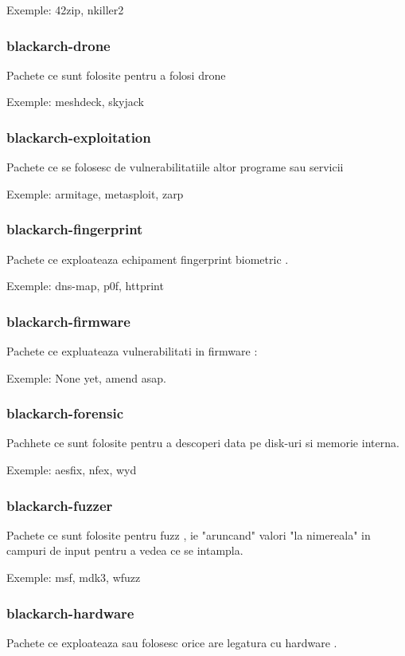 \documentclass[a4paper, oneside, 11pt]{book}
\begin{document}
Exemple: 42zip, nkiller2

\subsubsection{blackarch-drone}
Pachete ce sunt folosite pentru a folosi drone

Exemple: meshdeck, skyjack

\subsubsection{blackarch-exploitation}
Pachete ce se folosesc de vulnerabilitatiile altor programe sau servicii

Exemple: armitage, metasploit, zarp

\subsubsection{blackarch-fingerprint}
Pachete ce exploateaza  echipament fingerprint biometric .

Exemple: dns-map, p0f, httprint

\subsubsection{blackarch-firmware}
Pachete ce expluateaza vulnerabilitati in firmware :

Exemple: None yet, amend asap.

\subsubsection{blackarch-forensic}
Pachhete ce sunt folosite pentru a descoperi data pe disk-uri si memorie interna.

Exemple: aesfix, nfex, wyd

\subsubsection{blackarch-fuzzer}
Pachete ce sunt folosite pentru fuzz , ie
"aruncand" valori "la nimereala" in campuri de input pentru a vedea ce se intampla.

Exemple: msf, mdk3, wfuzz

\subsubsection{blackarch-hardware}
Pachete ce exploateaza sau folosesc orice are legatura cu hardware .
\end{document}
